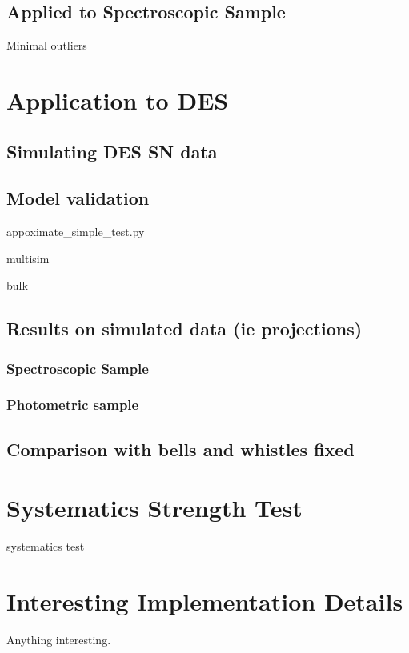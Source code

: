 \documentclass[a4paper,fleqn,usenatbib]{mnras}
\begin{document}
\subsection{Applied to Spectroscopic Sample}

Minimal outliers

\section{Application to DES}
\label{sec:des}

\subsection{Simulating DES SN data}

\subsection{Model validation}

appoximate\_simple\_test.py

multisim

bulk


\subsection{Results on simulated data (ie projections)}

\subsubsection{Spectroscopic Sample}

\subsubsection{Photometric sample}

\subsection{Comparison with bells and whistles fixed}


\section{Systematics Strength Test}
\label{sec:sys}

systematics test

\section{Interesting Implementation Details}
\label{sec:details}
Anything interesting.
\end{document}

